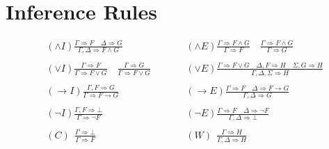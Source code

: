 \newpage
\section*{Inference Rules}

\begin{align*}
& (\wedge I) \frac{ \Gamma \Rightarrow F \quad \Delta \Rightarrow G}{\Gamma, \Delta \Rightarrow F \wedge G} \qquad
& &(\wedge E) \frac{ \Gamma \Rightarrow F \wedge G}{\Gamma \Rightarrow F}
 \quad  \frac{ \Gamma \Rightarrow F \wedge G}{\Gamma \Rightarrow  G} \\ \\
&(\vee I) \frac{ \Gamma \Rightarrow F}{ \Gamma \Rightarrow F \vee G} \quad
\frac{ \Gamma \Rightarrow G}{ \Gamma \Rightarrow F \vee G} \qquad
& &(\vee E) \frac{ \Gamma \Rightarrow F \vee G \quad \Delta, F \Rightarrow H \quad \Sigma, G \Rightarrow H} {  \Gamma, \Delta, \Sigma \Rightarrow H} \\ \\
& (\rightarrow I) \frac{\Gamma, F \Rightarrow G}{\Gamma \Rightarrow F \rightarrow G} \qquad
& &(\rightarrow E) \frac{\Gamma \Rightarrow F \quad \Delta \Rightarrow F \rightarrow G}{\Gamma, \Delta \Rightarrow G}  \\ \\
& (\neg I) \frac{\Gamma, F \Rightarrow \bot}{\Gamma \Rightarrow \neg F} \qquad
& &(\neg E) \frac{\Gamma \Rightarrow F \quad \Delta \Rightarrow \neg F}{\Gamma, \Delta \Rightarrow \bot}   \\ \\
&(C)~~\frac{\Gamma \Rightarrow \bot}{\Gamma \Rightarrow F} \qquad
& & (W)~~ \frac{\Gamma \Rightarrow H}{\Gamma, \Delta \Rightarrow H}
\end{align*}

\vspace{1cm}

